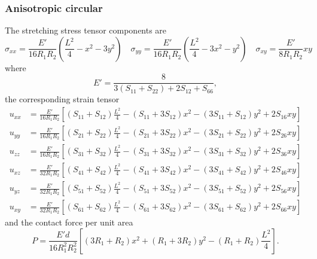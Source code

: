 \documentclass[11pt,a4paper]{article}
\begin{document}
\subsubsection{Anisotropic circular}
The stretching stress tensor components are 
\begin{equation}
\sigma_{xx} =  \frac{E'}{16 R_1 R_2}\left( \frac{L^2}{4} - x^2 - 3 y^2 \right) \quad 
\sigma_{yy} =  \frac{E'}{16 R_1 R_2}\left(\frac{L^2}{4} - 3 x^2 - y^2\right) \quad
\sigma_{xy} = \frac{E'}{8 R_1 R_2}x y
\end{equation}
where 
\begin{equation}
E' = \frac{8}{3(S_{11}+S_{22})+2 S_{12}+S_{66}},
\end{equation}
the corresponding strain tensor 
\begin{align}
u_{xx} &= \frac{E'}{16 R_1 R_2} \left[ (S_{11}+S_{12})\frac{L^2}{4} - (S_{11} + 3 S_{12}) x^2  -(3 S_{11} + S_{12}) y^2 + 2 S_{16} xy \right] \\
u_{yy} &= \frac{E'}{16 R_1 R_2} \left[ (S_{21}+S_{22})\frac{L^2}{4} - (S_{21} + 3 S_{22}) x^2  -(3 S_{21} + S_{22}) y^2 + 2 S_{26} xy \right] \\
u_{zz} &= \frac{E'}{16 R_1 R_2} \left[ (S_{31}+S_{32})\frac{L^2}{4} - (S_{31} + 3 S_{32}) x^2  -(3 S_{31} + S_{32}) y^2 + 2 S_{36} xy \right] \\
u_{xz} &= \frac{E'}{32 R_1 R_2} \left[ (S_{41}+S_{42})\frac{L^2}{4} - (S_{41} + 3 S_{42}) x^2  -(3 S_{41} + S_{42}) y^2 + 2 S_{46} xy \right] \\
u_{yz} &= \frac{E'}{32 R_1 R_2} \left[ (S_{51}+S_{52})\frac{L^2}{4} - (S_{51} + 3 S_{52}) x^2  -(3 S_{51} + S_{52}) y^2 + 2 S_{56} xy \right] \\
u_{xy} &= \frac{E'}{32 R_1 R_2} \left[ (S_{61}+S_{62})\frac{L^2}{4} - (S_{61} + 3 S_{62}) x^2  -(3 S_{61} + S_{62}) y^2 + 2 S_{66} xy \right]
\end{align}
and the contact force per unit area
\begin{equation}
P = \frac{E' d}{16 R_1^2 R_2^2} \left[ 
\left(3 R_1 + R_2 \right) x^2
+ \left(R_1 + 3 R_2 \right) y^2
- \left(R_1 + R_2 \right)\frac{L^2}{4}
\right].
\end{equation}



\end{document}
